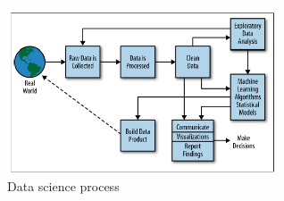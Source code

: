 \documentclass[12pt,a4paper]{article}
\begin{document}
\begin{figure}[h!]
\centerline{\includegraphics[width=8cm]{Figure2-2}}
\caption{Data science process \cite{schutt2013doing}}
\label{fig1}
\end{figure}



\end{document}

